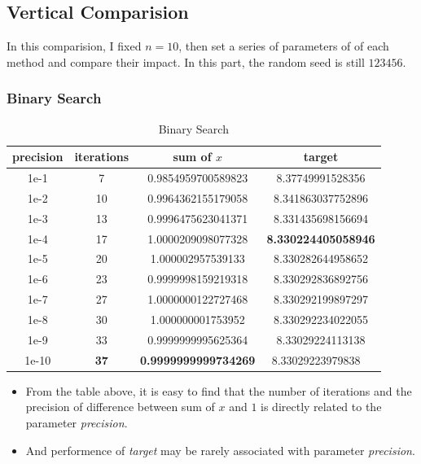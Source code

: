\documentclass[12pt, a4paper, oneside]{article}
\begin{document}
\subsection{Vertical Comparision}
In this comparision, I fixed $n = 10$, then set a series of parameters of of each method and compare their impact. In this part, the random seed is still $123456$.
\subsubsection{Binary Search}
\begin{table}[H]
    \begin{center}
      \caption{Binary Search}
      \begin{tabular}{c|c|c|c} %
        \textbf{precision} & \textbf{iterations} & \textbf{sum of $x$} & \textbf{target}\\
        \hline
        1e-1 & 7 & 0.9854959700589823 & 8.37749991528356 \\
        1e-2 & 10 & 0.9964362155179058 & 8.341863037752896 \\
        1e-3 & 13 & 0.9996475623041371 & 8.331435698156694 \\
        1e-4 & 17 & 1.0000209098077328 & \textbf{8.330224405058946} \\
        1e-5 & 20 & 1.000002957539133 & 8.330282644958652 \\
        1e-6 & 23 & 0.9999998159219318 & 8.330292836892756 \\
        1e-7 & 27 & 1.0000000122727468 & 8.330292199897297 \\
        1e-8 & 30 & 1.000000001753952 & 8.330292234022055 \\
        1e-9 & 33 & 0.9999999995625364 & 8.33029224113138 \\
        1e-10 & \textbf{37} & \textbf{0.9999999999734269} & 8.33029223979838 \
      \end{tabular}
    \end{center}
\end{table}
\begin{itemize}
    \item From the table above, it is easy to find that the number of iterations and the precision of difference between sum of $x$ and $1$ is directly related to the parameter \emph{precision}.
    \item And performence of \emph{target} may be rarely associated with parameter \emph{precision}.
\end{itemize}
\end{document}
